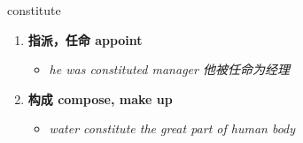 
\begin{frame}
{\huge constitute}
\begin{center}
\begin{enumerate}\Large
  \item \textbf{指派，任命 appoint}
  \begin{itemize}
    \item \em{\Large{he was constituted manager 他被任命为经理}}
  \end{itemize}
  \item \textbf{构成 compose, make up}
  \begin{itemize}
    \item \em{\Large{water constitute the great part of human body}}
  \end{itemize}
\end{enumerate}
\end{center}
\end{frame}
